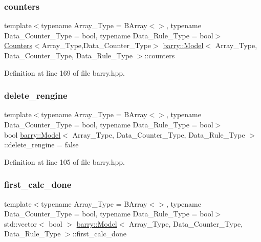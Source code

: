 \subsubsection{\texorpdfstring{counters}{counters}}
{\footnotesize\ttfamily template$<$typename Array\+\_\+\+Type  = B\+Array$<$$>$, typename Data\+\_\+\+Counter\+\_\+\+Type  = bool, typename Data\+\_\+\+Rule\+\_\+\+Type  = bool$>$ \\
\hyperlink{classbarry_1_1_counters}{Counters}$<$Array\+\_\+\+Type,Data\+\_\+\+Counter\+\_\+\+Type$>$ \hyperlink{classbarry_1_1_model}{barry\+::\+Model}$<$ Array\+\_\+\+Type, Data\+\_\+\+Counter\+\_\+\+Type, Data\+\_\+\+Rule\+\_\+\+Type $>$\+::counters}



Definition at line 169 of file barry.\+hpp.

\mbox{\label{classbarry_1_1_model_aa408b3be05b44d4fac590a776822efdd}} 
\subsubsection{\texorpdfstring{delete\+\_\+rengine}{delete\_rengine}}
{\footnotesize\ttfamily template$<$typename Array\+\_\+\+Type  = B\+Array$<$$>$, typename Data\+\_\+\+Counter\+\_\+\+Type  = bool, typename Data\+\_\+\+Rule\+\_\+\+Type  = bool$>$ \\
bool \hyperlink{classbarry_1_1_model}{barry\+::\+Model}$<$ Array\+\_\+\+Type, Data\+\_\+\+Counter\+\_\+\+Type, Data\+\_\+\+Rule\+\_\+\+Type $>$\+::delete\+\_\+rengine = false}



Definition at line 105 of file barry.\+hpp.

\mbox{\label{classbarry_1_1_model_ae7b6def02fcb353830362713490c9825}} 
\subsubsection{\texorpdfstring{first\+\_\+calc\+\_\+done}{first\_calc\_done}}
{\footnotesize\ttfamily template$<$typename Array\+\_\+\+Type  = B\+Array$<$$>$, typename Data\+\_\+\+Counter\+\_\+\+Type  = bool, typename Data\+\_\+\+Rule\+\_\+\+Type  = bool$>$ \\
std\+::vector$<$ bool $>$ \hyperlink{classbarry_1_1_model}{barry\+::\+Model}$<$ Array\+\_\+\+Type, Data\+\_\+\+Counter\+\_\+\+Type, Data\+\_\+\+Rule\+\_\+\+Type $>$\+::first\+\_\+calc\+\_\+done}



